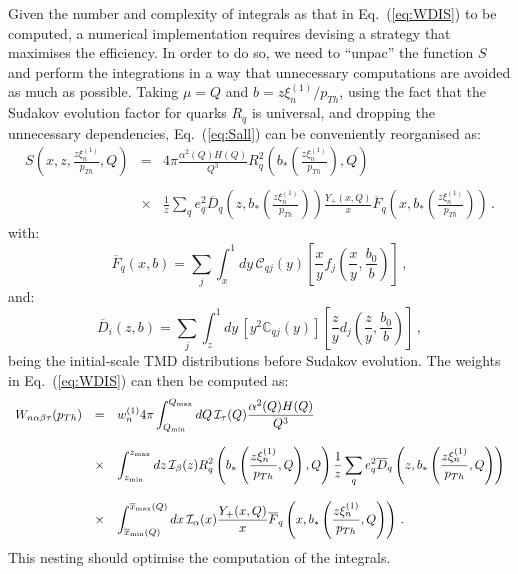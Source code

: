 \documentclass[10pt,a4paper]{article}
\begin{document}
Given the number and complexity of integrals as that in
Eq.~(\ref{eq:WDIS}) to be computed, a numerical implementation
requires devising a strategy that maximises the efficiency. In order
to do so, we need to ``unpac'' the function $S$ and perform the
integrations in a way that unnecessary computations are avoided as
much as possible. Taking $\mu = Q$ and $b = z\xi_n^{(1)} /p_{Th}$,
using the fact that the Sudakov evolution factor for quarks $R_q$ is
universal, and dropping the unnecessary dependencies,
Eq.~(\ref{eq:Sall}) can be conveniently reorganised as:
\begin{equation}
\begin{array}{rcl}
\displaystyle
  S\left(x,z,\frac{z\xi_n^{(1)}}{p_{Th}},Q\right)&=&\displaystyle
                                                     4\pi \frac{\alpha^2(Q)H(Q)}{Q^3}R_q^2\left(b_*\left(\frac{z\xi_n^{(1)}}{p_{Th}}\right),Q\right)\\
\\
&\times&\displaystyle \frac1{z}\sum_qe_q^2\overline{D}_q\left(z,b_*\left(\frac{z\xi_n^{(1)}}{p_{Th}}\right)\right)\frac{Y_+(x,Q)}{x}\overline{F}_q\left(x,b_*\left(\frac{z\xi_n^{(1)}}{p_{Th}}\right)\right)\,.
\end{array}
\end{equation}
with:
\begin{equation}
\overline{F}_q(x,b) = \sum_{j}\int_x^1dy\,\mathcal{C}_{qj}(y)\left[\frac{x}{y}f_j\left(\frac{x}{y},\frac{b_0}{b}\right)\right]\,,
\end{equation}
and:
\begin{equation}
\overline{D}_{i}(z,b) = \sum_{j}\int_z^1dy\,\left[y^2\mathbb{C}_{qj}(y)\right]\left[\frac{z}{y}d_j\left(\frac{z}{y}, \frac{b_0}{b}\right)\right]\,,
\end{equation}
being the initial-scale TMD distributions before Sudakov
evolution. The weights in Eq.~(\ref{eq:WDIS}) can then be computed as:
\begin{equation}
\begin{array}{rcl}
\displaystyle
  W_{n\alpha\beta\tau}(p_{Th})&=&\displaystyle w_n^{(1)}
                                  4\pi
         \int_{Q_{\rm min}}^{Q_{\rm
      max}}dQ\,\mathcal{I}_\tau(Q) \frac{\alpha^2(Q)H(Q)}{Q^3}\\
\\
&\times&\displaystyle\int_{z_{\rm min}}^{z_{\rm max}}dz\,
  \mathcal{I}_\beta(z) 
                                                     R_q^2\left(b_*\left(\frac{z\xi_n^{(1)}}{p_{Th}},Q\right),Q\right)\frac1{z}\sum_qe_q^2 \overline{D}_q\left(z,b_*\left(\frac{z\xi_n^{(1)}}{p_{Th}},Q\right)\right)\\
\\
&\times&\displaystyle \int_{\overline{x}_{\rm min}(Q)}^{\overline{x}_{\rm
      max}(Q)}dx\, \mathcal{I}_\alpha(x)\frac{Y_+(x,Q)}{x}\overline{F}_q\left(x,b_*\left(\frac{z\xi_n^{(1)}}{p_{Th}},Q\right)\right)\,.
\end{array}
\end{equation}
This nesting should optimise the computation of the integrals.
\end{document}
